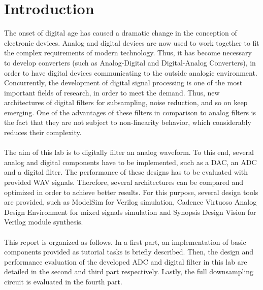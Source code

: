 \chapter*{Introduction}

The onset of digital age has caused a dramatic change in the conception of electronic devices. Analog and digital devices are now used to work together to fit the complex requirements of modern technology. Thus, it has become necessary to develop converters (such as Analog-Digital and Digital-Analog Converters), in order to have digital devices communicating to the outside analogic environment.\\
Concurrently, the development of digital signal processing is one of the most important fields of research, in order to meet the demand. Thus, new architectures of digital filters for subsampling, noise reduction, and so on keep emerging. One of the advantages of these filters in comparison to analog filters is the fact that they are not subject to non-linearity behavior, which considerably reduces their complexity.\\
\\
The aim of this lab is to digitally filter an analog waveform. To this end, several analog and digital components have to be implemented, such as a DAC, an ADC and a digital filter. The performance of these designs has to be evaluated with provided WAV signals. Therefore, several architectures can be compared and optimized in order to achieve better results. For this purpose, several design tools are provided, such as ModelSim for Verilog simulation, Cadence Virtuoso Analog Design Environment for mixed signals simulation and Synopsis Design Vision for Verilog module synthesis.\\
\\
This report is organized as follows. In a first part, an implementation of basic components provided as tutorial tasks is briefly described. Then, the design and performance evaluation of the developed ADC and digital filter in this lab are detailed in the second and third part respectively. Lastly, the full downsampling circuit is evaluated in the fourth part.
